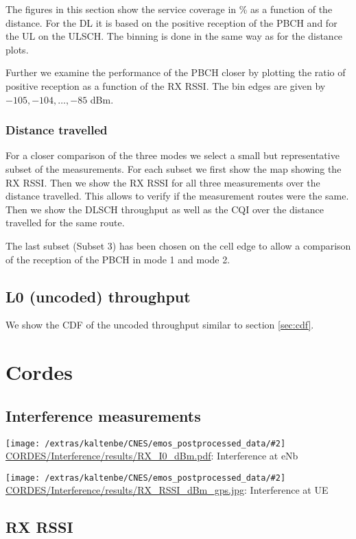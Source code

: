 \documentclass[a4paper,10pt]{article}
\newcommand{\printfile}[2][]{
 \begin{minipage}{8cm}
  \centering
  \texttt{[image: /extras/kaltenbe/CNES/emos\_postprocessed\_data/\#2]}
  \url{#2}: #1

 \end{minipage}
}
\begin{document}
The figures in this section show the service coverage in \% as a function of the distance. For the DL it is based on the positive reception of the PBCH and for the UL on the ULSCH. The binning is done in the same way as for the distance plots.

Further we examine the performance of the PBCH closer by plotting the ratio of positive reception as a function of the RX RSSI. The bin edges are given by  $-105, -104, \ldots, -85$ dBm.

\subsubsection{Distance travelled}
\label{sec:dist_travelled}

For a closer comparison of the three modes we select a small but representative subset of the measurements. For each subset we first show the map showing the RX RSSI. Then we show the RX RSSI for all three measurements over the distance travelled. This allows to verify if the measurement routes were the same. Then we show the DLSCH throughput as well as the CQI over the distance travelled for the same route. 

The last subset (Subset 3) has been chosen on the cell edge to allow a comparison of the reception of the PBCH in mode 1 and mode 2.



\subsection{L0 (uncoded) throughput}

We show the CDF of the uncoded throughput similar to section \ref{sec:cdf}.


\section{Cordes}
\label{sec:cordes}

\subsection{Interference measurements}

\printfile[Interference at eNb]{CORDES/Interference/results/RX_I0_dBm.pdf}
\printfile[Interference at UE]{CORDES/Interference/results/RX_RSSI_dBm_gps.jpg}


\subsection{RX RSSI}
\end{document}
